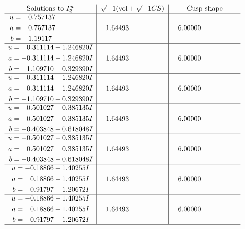 \documentclass[1p]{elsarticle_modified}
\theoremstyle{definition}
\newcommand{\I}{\sqrt{-1}}
\begin{document}
$$\begin{array}{c|c|c}  
\text{Solutions to }I^u_{3}& \I (\text{vol} + \sqrt{-1}CS) & \text{Cusp shape}\\
 \hline 
\begin{aligned}
u &= \phantom{-}0.757137\phantom{ +0.000000I} \\
a &= -0.757137\phantom{ +0.000000I} \\
b &= \phantom{-}1.19117\phantom{ +0.000000I}\end{aligned}
 & \phantom{-}1.64493\phantom{ +0.000000I} & \phantom{-}6.00000\phantom{ +0.000000I} \\ \hline\begin{aligned}
u &= \phantom{-}0.311114 + 1.246820 I \\
a &= -0.311114 - 1.246820 I \\
b &= -1.109710 - 0.329390 I\end{aligned}
 & \phantom{-}1.64493\phantom{ +0.000000I} & \phantom{-}6.00000\phantom{ +0.000000I} \\ \hline\begin{aligned}
u &= \phantom{-}0.311114 - 1.246820 I \\
a &= -0.311114 + 1.246820 I \\
b &= -1.109710 + 0.329390 I\end{aligned}
 & \phantom{-}1.64493\phantom{ +0.000000I} & \phantom{-}6.00000\phantom{ +0.000000I} \\ \hline\begin{aligned}
u &= -0.501027 + 0.385135 I \\
a &= \phantom{-}0.501027 - 0.385135 I \\
b &= -0.403848 + 0.618048 I\end{aligned}
 & \phantom{-}1.64493\phantom{ +0.000000I} & \phantom{-}6.00000\phantom{ +0.000000I} \\ \hline\begin{aligned}
u &= -0.501027 - 0.385135 I \\
a &= \phantom{-}0.501027 + 0.385135 I \\
b &= -0.403848 - 0.618048 I\end{aligned}
 & \phantom{-}1.64493\phantom{ +0.000000I} & \phantom{-}6.00000\phantom{ +0.000000I} \\ \hline\begin{aligned}
u &= -0.18866 + 1.40255 I \\
a &= \phantom{-}0.18866 - 1.40255 I \\
b &= \phantom{-}0.91797 - 1.20672 I\end{aligned}
 & \phantom{-}1.64493\phantom{ +0.000000I} & \phantom{-}6.00000\phantom{ +0.000000I} \\ \hline\begin{aligned}
u &= -0.18866 - 1.40255 I \\
a &= \phantom{-}0.18866 + 1.40255 I \\
b &= \phantom{-}0.91797 + 1.20672 I\end{aligned}
 & \phantom{-}1.64493\phantom{ +0.000000I} & \phantom{-}6.00000\phantom{ +0.000000I}\\
 \hline 
 \end{array}$$\newpage\newpage\renewcommand{\arraystretch}{1}
\end{document}
